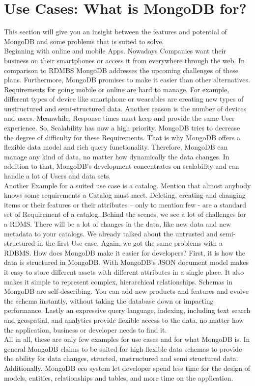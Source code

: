 \section{Use Cases: What is MongoDB for?}
This section will give you an insight between the features and potential of MongoDB and some problems that is suited to solve.
\\
Beginning with online and mobile Apps. Nowadays Companies want their business on their smartphones or access it from everywhere through the web. In comparison to RDMBS MongoDB addresses the upcoming challenges of these plans. Furthermore, MongoDB promises to make it easier than other alternatives. Requirements for going mobile or online are hard to manage. For example, different types of device like smartphone or wearables are creating new types of unstructured and semi-structured data. Another reason is the number of devices and users. Meanwhile, Response times must keep and provide the same User experience. So, Scalability has now a high priority. MongoDB tries to decrease the degree of difficulty for these Requirements. That is why MongoDB offers a flexible data model and rich query functionality. Therefore, MongoDB can manage any kind of data, no matter how dynamically the data changes. In addition to that, MongoDB’s development concentrates on scalability and can handle a lot of Users and data sets\cite{MongoDBInc.2013a}.
\\
Another Example for a suited use case is a catalog. Mention that almost anybody knows some requirements a Catalog must meet. Deleting, creating and changing items or their features or their attributes – only to mention few - are a standard set of Requirement of a catalog. Behind the scenes, we see a lot of challenges for a RDMS. There will be a lot of changes in the data, like new data and new metadata to your catalogs. We already talked about the untrusted and semi-structured in the first Use case. Again, we got the same problems with a RDBMS. How does MongoDB make it easier for developers? First, it is how the data is structured in MongoDB. With MongoDB’s JSON document model makes it easy to store different assets with different attributes in a single place. It also makes it simple to represent complex, hierarchical relationships. Schemas in MongoDB are self-describing. You can add new products and features and evolve the schema instantly, without taking the database down or impacting performance. Lastly an expressive query language, indexing, including text search and geospatial, and analytics provide flexible access to the data, no matter how the application, business or developer needs to find it\cite{MongoDBInc.2013a}.
\\
All in all, these are only few examples for use cases and for what MongoDB is. In general MongoDB claims to be suited for high flexible data schemas to provide the ability for data changes, structed, unstructured and semi structured data. Additionally, MongoDB eco system let developer spend less time for the design of models, entities, relationships and tables, and more time on the application\cite{MongoDBInc.2013a}.